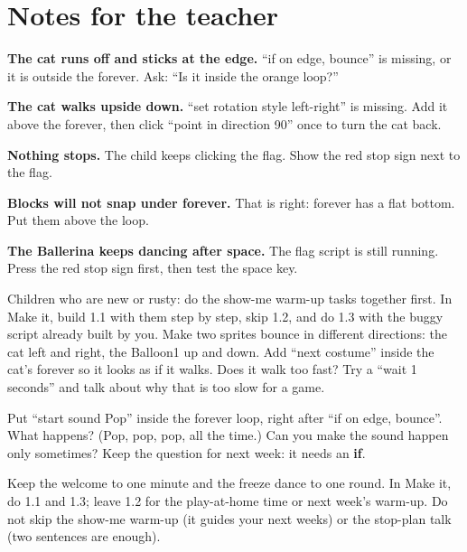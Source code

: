 \section{Notes for the teacher}
\begin{commonmistakes}
  \item \textbf{The cat runs off and sticks at the edge.} \enquote{if on edge, bounce} is missing, or it is outside the forever. Ask: \enquote{Is it inside the orange loop?}
  \item \textbf{The cat walks upside down.} \enquote{set rotation style left-right} is missing. Add it above the forever, then click \enquote{point in direction 90} once to turn the cat back.
  \item \textbf{Nothing stops.} The child keeps clicking the flag. Show the red stop sign next to the flag.
  \item \textbf{Blocks will not snap under forever.} That is right: forever has a flat bottom. Put them above the loop.
  \item \textbf{The Ballerina keeps dancing after space.} The flag script is still running. Press the red stop sign first, then test the space key.
\end{commonmistakes}

\begin{differentiation}
\supportpath Children who are new or rusty: do the show-me warm-up tasks together first. In Make it, build 1.1 with them step by step, skip 1.2, and do 1.3 with the buggy script already built by you.
\extensionpath Make two sprites bounce in different directions: the cat left and right, the Balloon1 up and down. Add \enquote{next costume} inside the cat's forever so it looks as if it walks. Does it walk too fast? Try a \enquote{wait 1 seconds} and talk about why that is too slow for a game.
\end{differentiation}

\begin{stretchchallenge}
Put \enquote{start sound Pop} inside the forever loop, right after \enquote{if on edge, bounce}. What happens? (Pop, pop, pop, all the time.) Can you make the sound happen only sometimes? Keep the question for next week: it needs an \textbf{if}.
\end{stretchchallenge}

\begin{teachernote}
Keep the welcome to one minute and the freeze dance to one round. In Make it, do 1.1 and 1.3; leave 1.2 for the play-at-home time or next week's warm-up. Do not skip the show-me warm-up (it guides your next weeks) or the stop-plan talk (two sentences are enough).
\end{teachernote}
